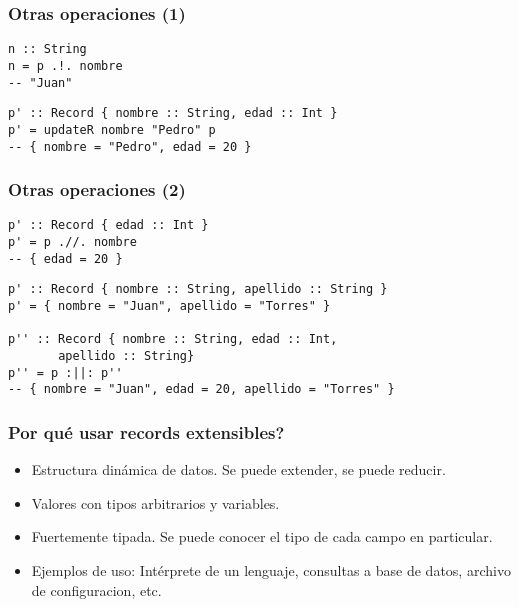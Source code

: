 \documentclass{beamer}
\begin{document}
\begin{frame}[fragile]
\frametitle{Otras operaciones (1)}

\begin{example}[Lookup]
\begin{verbatim}
n :: String
n = p .!. nombre
-- "Juan"
\end{verbatim}
\end{example}

\pause

\begin{example}[Update]
\begin{verbatim}
p' :: Record { nombre :: String, edad :: Int }
p' = updateR nombre "Pedro" p
-- { nombre = "Pedro", edad = 20 }
\end{verbatim}
\end{example}

\end{frame}

\begin{frame}[fragile]
\frametitle{Otras operaciones (2)}

\begin{example}[Delete]
\begin{verbatim}
p' :: Record { edad :: Int }
p' = p .//. nombre
-- { edad = 20 }
\end{verbatim}
\end{example}

\pause

\begin{example}[Union]
\begin{verbatim}
p' :: Record { nombre :: String, apellido :: String }
p' = { nombre = "Juan", apellido = "Torres" }

p'' :: Record { nombre :: String, edad :: Int,
       apellido :: String}
p'' = p :||: p''
-- { nombre = "Juan", edad = 20, apellido = "Torres" }
\end{verbatim}
\end{example}

\end{frame}

\begin{frame}
\frametitle{Por qué usar records extensibles?}

\begin{itemize}
\item Estructura dinámica de datos. Se puede extender, se puede reducir.
\item Valores con tipos arbitrarios y variables.
\item Fuertemente tipada. Se puede conocer el tipo de cada campo en particular.
\item Ejemplos de uso: Intérprete de un lenguaje, consultas a base de datos, archivo de configuracion, etc.
\end{itemize}

\end{frame}
\end{document}
